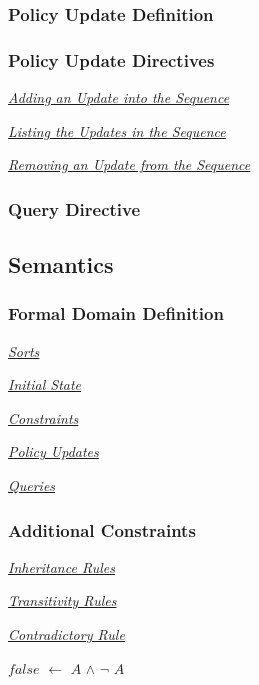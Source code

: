 \documentclass[10pt, twocolumn]{article}
\begin{document}
      \subsubsection{Policy Update Definition}

      \subsubsection{Policy Update Directives}

        \noindent\underline{\emph{Adding an Update into the Sequence}}

        \noindent\underline{\emph{Listing the Updates in the Sequence}}

        \noindent\underline{\emph{Removing an Update from the Sequence}}

      \subsubsection{Query Directive}

    \subsection{Semantics}

      \subsubsection{Formal Domain Definition}

        \noindent\underline{\emph{Sorts}}

        \noindent\underline{\emph{Initial State}}

        \noindent\underline{\emph{Constraints}}

        \noindent\underline{\emph{Policy Updates}}

        \noindent\underline{\emph{Queries}}

      \subsubsection{Additional Constraints}

        \noindent\underline{\emph{Inheritance Rules}}

        \noindent\underline{\emph{Transitivity Rules}}

        \noindent\underline{\emph{Contradictory Rule}}

          $false$ $\leftarrow$ $A$ $\land$ $\lnot$ $A$
\end{document}

